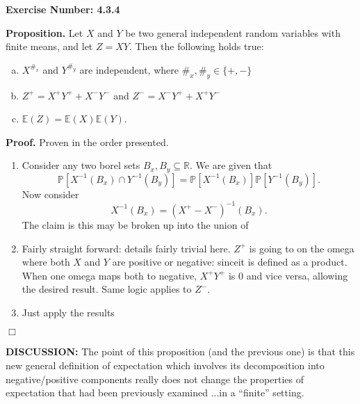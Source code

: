 \documentclass{article}
\begin{document}
\noindent \textbf{Exercise Number: 4.3.4}  %

\medskip 

\noindent \textbf{Proposition.} Let $X$ and $Y$ be two general independent random variables with finite means, and let $Z = XY$. Then the following holds true:

\begin{enumerate}[(a)]

\item $X^{\#_x}$ and $Y^{\#_y}$ are independent, where $\#_x, \#_y \in \{+,-\}$

\item $Z^+ = X^+ Y^+ + X^- Y^-$ and  $Z^- = X^- Y^+ + X^+ Y^-$

\item $\mathbb{E}(Z) = \mathbb{E}(X)  \mathbb{E}(Y)$. 

\end{enumerate}

\bigskip

\noindent \textbf{Proof.} Proven in the order presented.  

\begin{enumerate}

\item Consider any two borel sets $B_x, B_y \subseteq \mathbb{R}$. We are given that \[\mathbb{P}[X^{-1}(B_x) \cap Y^{-1}(B_y)] = \mathbb{P}[X^{-1}(B_x)] \mathbb{P}[Y^{-1}(B_y)].\] Now consider \[X^{-1}(B_x) = (X^+ - X^-)^{-1}(B_x).\] The claim is this may be broken up into the union of 

\item Fairly straight forward: details fairly trivial here. $Z^+$ is going to on the omega where both $X$ and $Y$ are positive or negative: sinceit is defined as a product. When one omega maps both to negative, $X^+ Y^+$ is 0 and vice versa, allowing the desired result. Same logic applies to $Z^-$.
 
\item Just apply the results 

\end{enumerate}

\hfill $\Box$


\bigskip

\noindent \textbf{DISCUSSION:} The point of this proposition (and the previous one) is that
this new general definition of expectation which involves its decomposition into negative/positive
components really does not change the properties of expectation that had been previously examined
...in a ``finite'' setting. 
\end{document}
